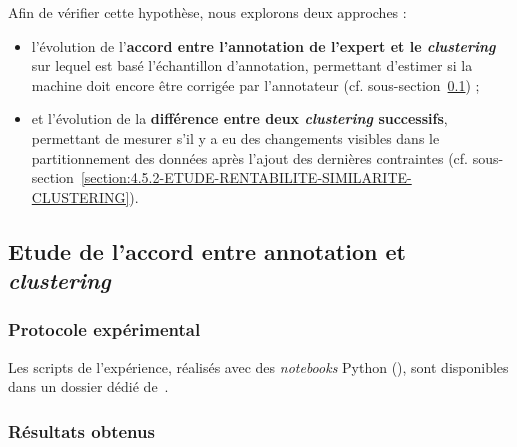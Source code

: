 	Afin de vérifier cette hypothèse, nous explorons deux approches :
	\begin{itemize}
		\item l'évolution de l'\textbf{accord entre l'annotation de l'expert et le \textit{clustering}} sur lequel est basé l'échantillon d'annotation, permettant d'estimer si la machine doit encore être corrigée par l'annotateur  (cf. sous-section~\ref{section:4.5.1-ETUDE-RENTABILITE-ACCORD-ANNOTATION-CLUSTERING}) ;
		\item et l'évolution de la \textbf{différence entre deux \textit{clustering} successifs}, permettant de mesurer s'il y a eu des changements visibles dans le partitionnement des données après l'ajout des dernières contraintes (cf. sous-section~\ref{section:4.5.2-ETUDE-RENTABILITE-SIMILARITE-CLUSTERING}).
	\end{itemize}
	
	
	\subsection{Etude de l'accord entre annotation et \textit{clustering}}
	\label{section:4.5.1-ETUDE-RENTABILITE-ACCORD-ANNOTATION-CLUSTERING}
		
	
		\subsubsection{Protocole expérimental}
			
			
			\begin{leftBarInformation}
				Les scripts de l'expérience, réalisés avec des \textit{notebooks} Python (\cite{van-rossum-drake:2009:python-reference-manual}), sont disponibles dans un dossier dédié de~\cite{schild:2021:cognitivefactory-interactiveclusteringcomparativestudy}.
			\end{leftBarInformation}

		\subsubsection{Résultats obtenus}
		
